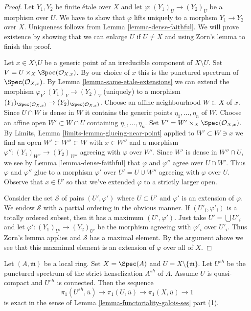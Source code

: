 \begin{proof}
Let $Y_1, Y_2$ be finite \'etale over $X$ and let
$\varphi : (Y_1)_U \to (Y_2)_U$ be a morphism over $U$. We have to show that
$\varphi$ lifts uniquely to a morphsm $Y_1 \to Y_2$ over $X$.
Uniqueness follows from Lemma \ref{lemma-dense-faithful}.
We will prove existence by showing that we can enlarge $U$
if $U \not = X$ and using Zorn's lemma to finish the proof.

\medskip\noindent
Let $x \in X \setminus U$ be a generic point of an irreducible component
of $X \setminus U$. Set $V = U \times_X \Spec(\mathcal{O}_{X, x})$.
By our choice of $x$ this is the punctured spectrum of
$\Spec(\mathcal{O}_{X, x})$. By
Lemma \ref{lemma-same-etale-extensions}
we can extend the morphism $\varphi_V : (Y_1)_V \to (Y_2)_V$
(uniquely) to a morphism
$(Y_1)_{\Spec(\mathcal{O}_{X, x})} \to (Y_2)_{\Spec(\mathcal{O}_{X, x})}$.
Choose an affine neighbourhood $W \subset X$ of $x$.
Since $U \cap W$ is dense in $W$ it contains the generic points
$\eta_1, \ldots, \eta_n$ of $W$. Choose an affine open
$W' \subset W \cap U$ containing $\eta_1, \ldots, \eta_n$.
Set $V' = W' \times_X \Spec(\mathcal{O}_{X, x})$.
By Limits, Lemma \ref{limits-lemma-glueing-near-point}
applied to $W' \subset W \ni x$
we find an open $W' \subset W'' \subset W$ with $x \in W''$
and a morphism $\varphi'' : (Y_1)_{W''} \to (Y_2)_{W''}$
agreeing with $\varphi$ over $W'$. Since $W'$ is dense in
$W'' \cap U$, we see by Lemma \ref{lemma-dense-faithful}
that $\varphi$ and $\varphi''$ agree over $U \cap W'$.
Thus $\varphi$ and $\varphi''$ glue to a morphism
$\varphi'$ over $U' = U \cup W''$ agreeing with $\varphi$ over $U$.
Observe that $x \in U'$ so that we've extended $\varphi$
to a strictly larger open.

\medskip\noindent
Consider the set $\mathcal{S}$ of pairs $(U', \varphi')$ where $U \subset U'$
and $\varphi'$ is an extension of $\varphi$. We endow $\mathcal{S}$
with a partial ordering in the obvious manner. If $(U'_i, \varphi'_i)$
is a totally ordered subset, then it has a maximum $(U', \varphi')$.
Just take $U' = \bigcup U'_i$ and let
$\varphi' : (Y_1)_{U'} \to (Y_2)_{U'}$ be the morphism
agreeing with $\varphi'_i$ over $U'_i$. Thus Zorn's lemma applies
and $\mathcal{S}$ has a maximal element. By the argument above
we see that this maxmimal element is an extension of $\varphi$
over all of $X$.
\end{proof}

\begin{lemma}
\label{lemma-local-exact-sequence}
Let $(A, \mathfrak m)$ be a local ring. Set $X = \Spec(A)$ and
$U = X \setminus \{\mathfrak m\}$. Let $U^{sh}$ be the punctured spectrum
of the strict henselization $A^{sh}$ of $A$.
Assume $U$ is quasi-compact and $U^{sh}$ is connected. Then the sequence
$$
\pi_1(U^{sh}, \overline{u}) \to \pi_1(U, \overline{u}) \to
\pi_1(X, \overline{u}) \to 1
$$
is exact in the sense of Lemma \ref{lemma-functoriality-galois-ses} part (1).
\end{lemma}

